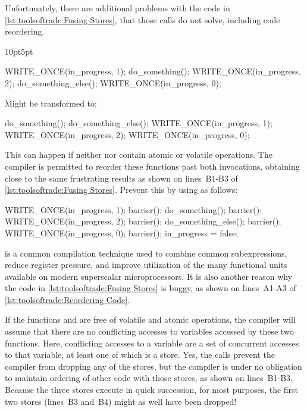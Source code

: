 \begin{description}[labelsep=.4em]
Unfortunately, there are additional problems with the code in
\cref{lst:toolsoftrade:Fusing Stores},
that those  calls do not solve, including code
reordering.

\begin{listing}[tb]
\begin{adjustwidth}{10pt}{5pt}
\footnotesize
\renewcommand{\myfvline}{A\arabic{FancyVerbLine}}
\begin{VerbatimT}
WRITE_ONCE(in_progress, 1);
do_something();
WRITE_ONCE(in_progress, 2);
do_something_else();
WRITE_ONCE(in_progress, 0);
\end{VerbatimT}
Might be transformed to:
\renewcommand{\myfvline}{B\arabic{FancyVerbLine}}
\begin{VerbatimT}
do_something();
do_something_else();
WRITE_ONCE(in_progress, 1);
WRITE_ONCE(in_progress, 2);
WRITE_ONCE(in_progress, 0);
\end{VerbatimT}
This can happen if neither  nor
 contain atomic or volatile operations.
The compiler is permitted to reorder these functions past both
 invocations, obtaining close to the same
frustrating results as shown on lines~B1-B3 of
\cref{lst:toolsoftrade:Fusing Stores}.
Prevent this by using  as follows:
\renewcommand{\myfvline}{C\arabic{FancyVerbLine}}
\begin{VerbatimT}
WRITE_ONCE(in_progress, 1);
barrier();
do_something();
barrier();
WRITE_ONCE(in_progress, 2);
barrier();
do_something_else();
barrier();
WRITE_ONCE(in_progress, 0);
barrier();
in_progress = false;
\end{VerbatimT}
\end{adjustwidth}
\caption{Reordering Code}
\label{lst:toolsoftrade:Reordering Code}
\end{listing}

\item[Code reordering] is a common compilation technique used to
combine common subexpressions, reduce register pressure, and
improve utilization of the many functional units available on
modern superscalar microprocessors.
It is also another reason why the code in
\cref{lst:toolsoftrade:Fusing Stores}
is buggy, as shown on lines~A1-A3 of
\cref{lst:toolsoftrade:Reordering Code}.

If the functions  and  are free
of volatile and atomic operations, the compiler will assume that there
are no conflicting accesses to variables accessed by these two functions.
Here, conflicting accesses to a variable are a set of concurrent accesses
to that variable, at least one of which is a store.
Yes, the  calls prevent the compiler from dropping
any of the stores, but the compiler is under no obligation to maintain
ordering of other code with those stores, as shown on lines~B1-B3.
Because the three stores execute in quick succession, for most purposes,
the first two stores (lines~B3 and~B4) might as well have been dropped!


\end{description}
